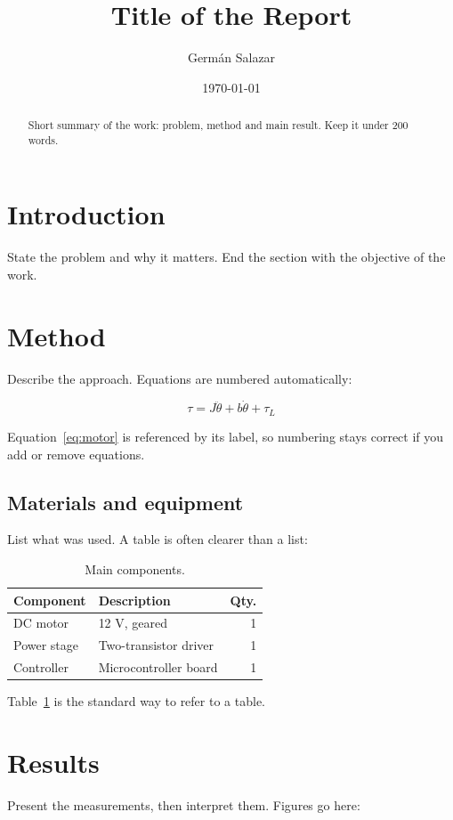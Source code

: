 \documentclass[12pt,a4paper]{article}
\title{Title of the Report}
\author{Germ\'an Salazar}
\date{\today}
\begin{document}
\maketitle

\begin{abstract}
Short summary of the work: problem, method and main result. Keep it under 200 words.
\end{abstract}

\tableofcontents
\newpage

\section{Introduction}
State the problem and why it matters. End the section with the objective of the work.

\section{Method}
Describe the approach. Equations are numbered automatically:

\begin{equation}
  \tau = J\ddot{\theta} + b\dot{\theta} + \tau_{L}
  \label{eq:motor}
\end{equation}

Equation~\eqref{eq:motor} is referenced by its label, so numbering stays correct if
you add or remove equations.

\subsection{Materials and equipment}
List what was used. A table is often clearer than a list:

\begin{table}[h]
  \centering
  \caption{Main components.}
  \label{tab:components}
  \begin{tabular}{llr}
    \toprule
    Component & Description & Qty. \\
    \midrule
    DC motor & 12 V, geared & 1 \\
    Power stage & Two-transistor driver & 1 \\
    Controller & Microcontroller board & 1 \\
    \bottomrule
  \end{tabular}
\end{table}

Table~\ref{tab:components} is the standard way to refer to a table.

\section{Results}
Present the measurements, then interpret them. Figures go here:
\end{document}
